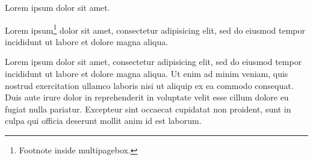 \documentclass[a5paper]{jsbook}
\begin{document}
\begin{multipagebox}
Lorem ipsum dolor sit amet.
\end{multipagebox}

\begin{multipagebox}
Lorem ipsum\footnote{Footnote inside multipagebox. }%
 dolor sit amet, consectetur adipisicing elit, sed do
eiusmod tempor incididunt ut labore et dolore magna aliqua.
\end{multipagebox}

Lorem ipsum dolor sit amet, consectetur adipisicing elit, sed do
eiusmod tempor incididunt ut labore et dolore magna aliqua. Ut enim ad
minim veniam, quis nostrud exercitation ullamco laboris nisi ut
aliquip ex ea commodo consequat. Duis aute irure dolor in
reprehenderit in voluptate velit esse cillum dolore eu fugiat nulla
pariatur. Excepteur sint occaecat cupidatat non proident, sunt in
culpa qui officia deserunt mollit anim id est laborum.
\end{document}
